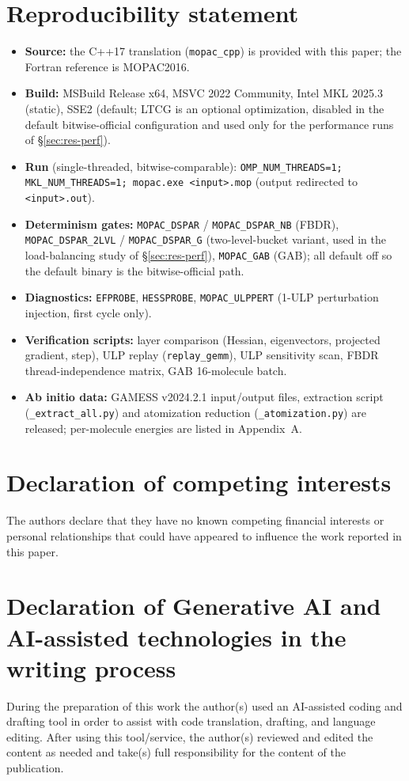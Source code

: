\documentclass[preprint,12pt]{elsarticle}
\begin{document}
\section*{Reproducibility statement}\label{sec:repro}
\begin{itemize}
\item \textbf{Source:} the C++17 translation (\texttt{mopac\_cpp}) is provided with this paper; the Fortran reference is MOPAC2016.
\item \textbf{Build:} MSBuild Release x64, MSVC 2022 Community, Intel MKL 2025.3 \cite{intelmkl} (static), SSE2 (default; LTCG is an optional optimization, disabled in the default bitwise-official configuration and used only for the performance runs of \S\ref{sec:res-perf}).
\item \textbf{Run} (single-threaded, bitwise-comparable): \texttt{OMP\_NUM\_THREADS=1; MKL\_NUM\_THREADS=1; mopac.exe <input>.mop} (output redirected to \texttt{<input>.out}).
\item \textbf{Determinism gates:} \texttt{MOPAC\_DSPAR} / \texttt{MOPAC\_DSPAR\_NB} (FBDR), \texttt{MOPAC\_DSPAR\_2LVL} / \texttt{MOPAC\_DSPAR\_G} (two-level-bucket variant, used in the load-balancing study of \S\ref{sec:res-perf}), \texttt{MOPAC\_GAB} (GAB); all default off so the default binary is the bitwise-official path.
\item \textbf{Diagnostics:} \texttt{EFPROBE}, \texttt{HESSPROBE}, \texttt{MOPAC\_ULPPERT} (1-ULP perturbation injection, first cycle only).
\item \textbf{Verification scripts:} layer comparison (Hessian, eigenvectors, projected gradient, step), ULP replay (\texttt{replay\_gemm}), ULP sensitivity scan, FBDR thread-independence matrix, GAB 16-molecule batch.
\item \textbf{Ab initio data:} GAMESS v2024.2.1 input/output files, extraction script (\texttt{\_extract\_all.py}) and atomization reduction (\texttt{\_atomization.py}) are released; per-molecule energies are listed in Appendix~A.
\end{itemize}


\section*{Declaration of competing interests}
The authors declare that they have no known competing financial interests or personal relationships that could have appeared to influence the work reported in this paper.

\section*{Declaration of Generative AI and AI-assisted technologies in the writing process}
During the preparation of this work the author(s) used an AI-assisted coding and drafting tool in order to assist with code translation, drafting, and language editing. After using this tool/service, the author(s) reviewed and edited the content as needed and take(s) full responsibility for the content of the publication.
\end{document}
